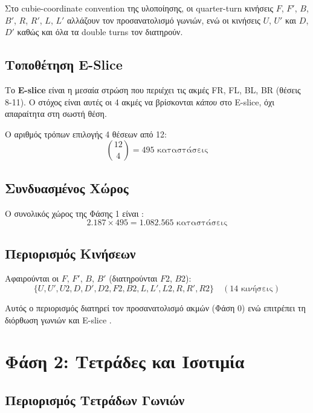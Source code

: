 Στο cubie-coordinate convention της υλοποίησης, οι quarter-turn κινήσεις
$F$, $F'$, $B$, $B'$, $R$, $R'$, $L$, $L'$ αλλάζουν τον προσανατολισμό
γωνιών, ενώ οι κινήσεις $U$, $U'$ και $D$, $D'$ καθώς και όλα τα double turns
τον διατηρούν.

\subsection{Τοποθέτηση E-Slice}

Το \textbf{E-slice} είναι η μεσαία στρώση που περιέχει τις ακμές FR, FL, BL, BR (θέσεις 8-11). Ο στόχος είναι αυτές οι 4 ακμές να βρίσκονται \textit{κάπου} στο E-slice, όχι απαραίτητα στη σωστή θέση.

Ο αριθμός τρόπων επιλογής 4 θέσεων από 12:
\begin{equation}
    \binom{12}{4} = 495 \text{ καταστάσεις}
\end{equation}

\subsection{Συνδυασμένος Χώρος}

Ο συνολικός χώρος της Φάσης 1 είναι \cite{scherphuis_thistlethwaite_summary,kociemba_twophase}:
\begin{equation}
    2.187 \times 495 = 1.082.565 \text{ καταστάσεις}
\end{equation}

\subsection{Περιορισμός Κινήσεων}

Αφαιρούνται οι $F$, $F'$, $B$, $B'$ (διατηρούνται $F2$, $B2$):
\begin{equation}
    \{U, U', U2, D, D', D2, F2, B2, L, L', L2, R, R', R2\} \quad (14 \text{ κινήσεις})
\end{equation}

Αυτός ο περιορισμός διατηρεί τον προσανατολισμό ακμών (Φάση 0) ενώ επιτρέπει τη διόρθωση γωνιών και E-slice \cite{scherphuis_thistlethwaite_summary,kociemba_twophase_details}.


\section{Φάση 2: Τετράδες και Ισοτιμία}
\label{sec:phase2}

\subsection{Περιορισμός Τετράδων Γωνιών}

